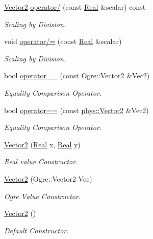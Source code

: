 \begin{DoxyCompactItemize}
\hyperlink{classphys_1_1Vector2}{Vector2} \hyperlink{classphys_1_1Vector2_a51f7d8ce03f7ab05137b277532edf93b}{operator/} (const \hyperlink{namespacephys_af7eb897198d265b8e868f45240230d5f}{Real} \&scalar) const 
\begin{DoxyCompactList}\small\item\em Scaling by Division. \item\end{DoxyCompactList}\item 
void \hyperlink{classphys_1_1Vector2_a27a0da5b4cfa49ea92dd16107692775b}{operator/=} (const \hyperlink{namespacephys_af7eb897198d265b8e868f45240230d5f}{Real} \&scalar)
\begin{DoxyCompactList}\small\item\em Scaling by Division. \item\end{DoxyCompactList}\item 
bool \hyperlink{classphys_1_1Vector2_a2fe433e9401748547b19cc5be891ed52}{operator==} (const Ogre::Vector2 \&Vec2)
\begin{DoxyCompactList}\small\item\em Equality Comparison Operator. \item\end{DoxyCompactList}\item 
bool \hyperlink{classphys_1_1Vector2_a89874b6def8107146ca7079a2de49360}{operator==} (const \hyperlink{classphys_1_1Vector2}{phys::Vector2} \&Vec2)
\begin{DoxyCompactList}\small\item\em Equality Comparison Operator. \item\end{DoxyCompactList}\item 
\hyperlink{classphys_1_1Vector2_ae8d3c95a5a60d12e706739cbadf01ffb}{Vector2} (\hyperlink{namespacephys_af7eb897198d265b8e868f45240230d5f}{Real} x, \hyperlink{namespacephys_af7eb897198d265b8e868f45240230d5f}{Real} y)
\begin{DoxyCompactList}\small\item\em Real value Constructor. \item\end{DoxyCompactList}\item 
\hyperlink{classphys_1_1Vector2_af3dbb91ef994e19b68c84e4e26eafac3}{Vector2} (Ogre::Vector2 Vec)
\begin{DoxyCompactList}\small\item\em Ogre Value Constructor. \item\end{DoxyCompactList}\item 
\hyperlink{classphys_1_1Vector2_a1e9c6000e5acd162a49836414a27bac7}{Vector2} ()
\begin{DoxyCompactList}\small\item\em Default Constructor. \item\end{DoxyCompactList}\end{DoxyCompactItemize}
